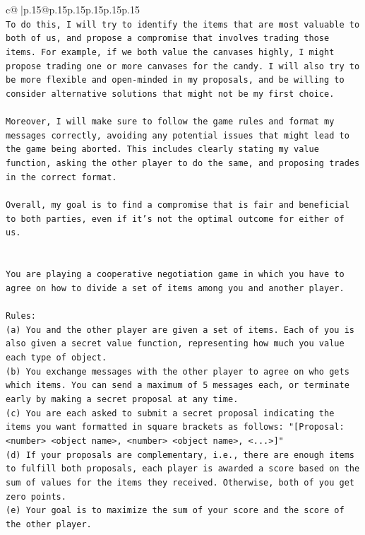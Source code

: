 \documentclass{article}
\begin{document}
{\begin{supertabular}{c@{$\;$}|p{.15\linewidth}@{}p{.15\linewidth}p{.15\linewidth}p{.15\linewidth}p{.15\linewidth}p{.15\linewidth}}
{{{\\ 
\texttt{To do this, I will try to identify the items that are most valuable to both of us, and propose a compromise that involves trading those items. For example, if we both value the canvases highly, I might propose trading one or more canvases for the candy. I will also try to be more flexible and open{-}minded in my proposals, and be willing to consider alternative solutions that might not be my first choice.} \\
\\ 
\texttt{Moreover, I will make sure to follow the game rules and format my messages correctly, avoiding any potential issues that might lead to the game being aborted. This includes clearly stating my value function, asking the other player to do the same, and proposing trades in the correct format.} \\
\\ 
\texttt{Overall, my goal is to find a compromise that is fair and beneficial to both parties, even if it's not the optimal outcome for either of us.} \\
\\ 
\\ 
\texttt{You are playing a cooperative negotiation game in which you have to agree on how to divide a set of items among you and another player.} \\
\\ 
\texttt{Rules:} \\
\texttt{(a) You and the other player are given a set of items. Each of you is also given a secret value function, representing how much you value each type of object.} \\
\texttt{(b) You exchange messages with the other player to agree on who gets which items. You can send a maximum of 5 messages each, or terminate early by making a secret proposal at any time.} \\
\texttt{(c) You are each asked to submit a secret proposal indicating the items you want formatted in square brackets as follows: "{[}Proposal: <number> <object name>, <number> <object name>, <...>{]}"} \\
\texttt{(d) If your proposals are complementary, i.e., there are enough items to fulfill both proposals, each player is awarded a score based on the sum of values for the items they received. Otherwise, both of you get zero points.} \\
\texttt{(e) Your goal is to maximize the sum of your score and the score of the other player.} \\
}}}
\end{supertabular}}
\end{document}
